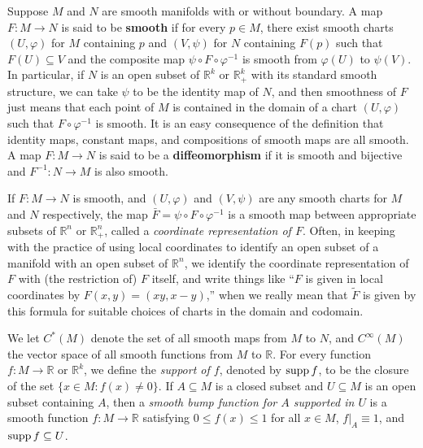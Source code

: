 Suppose $M$ and $N$ are smooth manifolds with or without boundary. A map $F: M \to N$ is said to be \textbf{smooth} if for every $p \in M$, there exist smooth charts $(U, \varphi)$ for $M$ containing $p$ and $(V, \psi)$ for $N$ containing $F(p)$ such that $F(U) \subseteq V$ and the composite map $\psi \circ F \circ \varphi^{-1}$ is smooth from $\varphi(U)$ to $\psi(V)$. In particular, if $N$ is an open subset of $\mathbb{R}^k$ or $\mathbb{R}^k_+$ with its standard smooth structure, we can take $\psi$ to be the identity map of $N$, and then smoothness of $F$ just means that each point of $M$ is contained in the domain of a chart $(U, \varphi)$ such that $F \circ \varphi^{-1}$ is smooth. It is an easy consequence of the definition that identity maps, constant maps, and compositions of smooth maps are all smooth. A map $F: M \to N$ is said to be a \textbf{diffeomorphism} if it is smooth and bijective and $F^{-1}: N \to M$ is also smooth.

If $F: M \to N$ is smooth, and $(U, \varphi)$ and $(V, \psi)$ are any smooth charts for $M$ and $N$ respectively, the map $\bar{F} = \psi \circ F \circ \varphi^{-1}$ is a smooth map between appropriate subsets of $\mathbb{R}^n$ or $\mathbb{R}^n_+$, called a \textit{coordinate representation of $F$}. Often, in keeping
with the practice of using local coordinates to identify an open subset of a manifold
with an open subset of $\mathbb{R}^n$, we identify the coordinate representation of $F$ with (the
restriction of) $F$ itself, and write things like ``$F$ is given in local coordinates by
$F(x,y) = (xy, x-y)$,'' when we really mean that $\tilde{F}$ is given by this formula for
suitable choices of charts in the domain and codomain.

We let $C^*(M)$ denote the set of all smooth maps from $M$ to $N$, and
$C^{\infty}(M)$ the vector space of all smooth functions from $M$ to $\mathbb{R}$. For every function
$f : M \to \mathbb{R}$ or $\mathbb{R}^k$, we define the \textit{support of $f$}, denoted by $\operatorname{supp} f$, to be the closure
of the set $\{x \in M : f(x) \neq 0\}$. If $A \subseteq M$ is a closed subset and $U \subseteq M$ is an
open subset containing $A$, then a \textit{smooth bump function for $A$ supported in $U$} is a
smooth function $f : M \to \mathbb{R}$ satisfying $0 \le f(x) \le 1$ for all $x \in M$, $f|_A \equiv 1$, and
$\operatorname{supp} f \subseteq U$.


